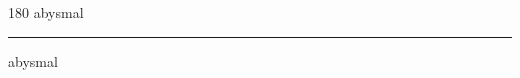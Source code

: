 
\begin{frame}
\begin{center}
\begin{turn}{180}
{\fontsize{2.5cm}{1em}\selectfont abysmal}
\end{turn}
\vspace{1em}\par  
\hrule
\vspace{1em}\par  
{\fontsize{2.5cm}{1em}\selectfont abysmal}
\end{center}
\end{frame}
